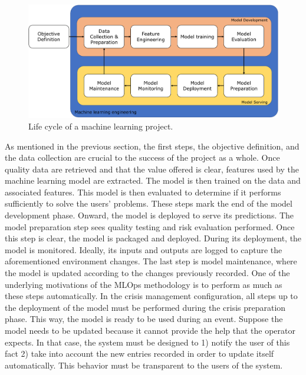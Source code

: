 \begin{figure}[htb]
    \centering
    \includegraphics[width=\textwidth]{figures/chap-5/machine-learning-life-cycle.pdf}
    \caption{Life cycle of a machine learning project.}
    \label{system:ml-life-cycle}
\end{figure}

As mentioned in the previous section, the first steps, the objective definition, and the data collection are crucial to the success of the project as a whole.
Once quality data are retrieved and that the value offered is clear, features used by the machine learning model are extracted.
The model is then trained on the data and associated features.
This model is then evaluated to determine if it performs sufficiently to solve the users' problems.
These steps mark the end of the model development phase.
Onward, the model is deployed to serve its predictions.
The model preparation step sees quality testing and risk evaluation performed.
Once this step is clear, the model is packaged and deployed.
During its deployment, the model is monitored.
Ideally, its inputs and outputs are logged to capture the aforementioned environment changes.
The last step is model maintenance, where the model is updated according to the changes previously recorded.
One of the underlying motivations of the MLOps methodology is to perform as much as these steps automatically.
In the crisis management configuration, all steps up to the deployment of the model must be performed during the crisis preparation phase.
This way, the model is ready to be used during an event.
Suppose the model needs to be updated because it cannot provide the help that the operator expects.
In that case, the system must be designed to 1) notify the user of this fact 2) take into account the new entries recorded in order to update itself automatically.
This behavior must be transparent to the users of the system.

